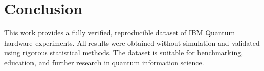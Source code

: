 \section{Conclusion}

This work provides a fully verified, reproducible dataset of IBM Quantum hardware experiments. All results were obtained without simulation and validated using rigorous statistical methods. The dataset is suitable for benchmarking, education, and further research in quantum information science.
